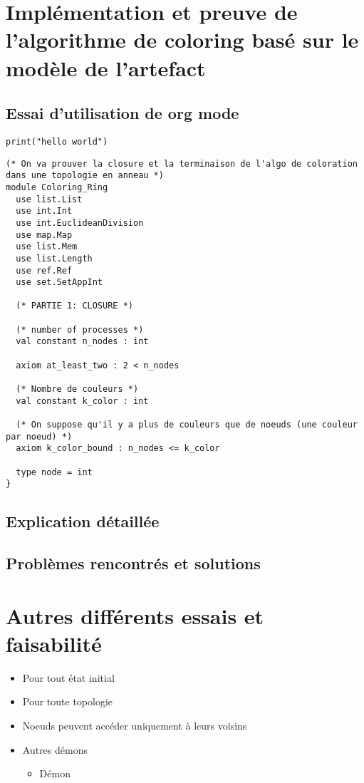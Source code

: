 \documentclass[11pt]{article}
\begin{document}
\section{Implémentation et preuve de l’algorithme de coloring basé sur le modèle de l'artefact}
\label{sec:org6414005}

\subsection{Essai d'utilisation de org mode}
\label{sec:org51258a9}
\begin{verbatim}
print("hello world")
\end{verbatim}
\begin{verbatim}
(* On va prouver la closure et la terminaison de l'algo de coloration dans une topologie en anneau *)
module Coloring_Ring
  use list.List
  use int.Int
  use int.EuclideanDivision
  use map.Map
  use list.Mem
  use list.Length
  use ref.Ref
  use set.SetAppInt

  (* PARTIE 1: CLOSURE *)

  (* number of processes *)
  val constant n_nodes : int

  axiom at_least_two : 2 < n_nodes

  (* Nombre de couleurs *)
  val constant k_color : int

  (* On suppose qu'il y a plus de couleurs que de noeuds (une couleur par noeud) *)
  axiom k_color_bound : n_nodes <= k_color

  type node = int
}
\end{verbatim}

\subsection{Explication détaillée}
\label{sec:orgcd34949}
\subsection{Problèmes rencontrés et solutions}
\label{sec:org2dc267f}

\section{Autres différents essais et faisabilité}
\label{sec:org8f6f262}
\begin{itemize}
\item Pour tout état initial
\item Pour toute topologie
\item Noeuds peuvent accéder uniquement à leurs voisins
\item Autres démons
\begin{itemize}
\item Démon
\end{itemize}
\end{itemize}
\end{document}
